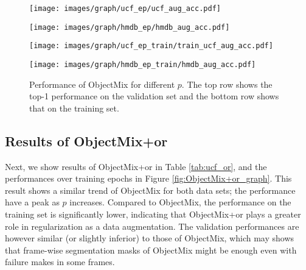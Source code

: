 \begin{figure}[t]
    \centering
    

    
    \begin{minipage}[t]{0.49\linewidth}
    \centering
    \texttt{[image: images/graph/ucf\_ep/ucf\_aug\_acc.pdf]}
    \end{minipage}
    \hfill
    \begin{minipage}[t]{0.49\linewidth}
    \centering
    \texttt{[image: images/graph/hmdb\_ep/hmdb\_aug\_acc.pdf]}
    \end{minipage}

    \begin{minipage}[t]{0.49\linewidth}
    \centering
    \texttt{[image: images/graph/ucf\_ep\_train/train\_ucf\_aug\_acc.pdf]}
    \label{fig:hmdb_aug_acc_t}
    \end{minipage}
    \hfill
    \begin{minipage}[t]{0.49\linewidth}
    \centering
    \texttt{[image: images/graph/hmdb\_ep\_train/hmdb\_aug\_acc.pdf]}
    \label{fig:hmdb_ep_acc}
    \end{minipage}

    \caption{
    Performance of ObjectMix for different $p$.
    The top row shows the top-1 performance on the validation set and the bottom row shows that on the training set.
    }

    \label{fig:ObjectMix_graph}
\end{figure}











\subsection{Results of ObjectMix+or}

Next, we show results of ObjectMix+or in Table \ref{tab:ucf_or},
and the performances over training epochs in Figure \ref{fig:ObjectMix+or_graph}.
This result shows a similar trend of ObjectMix for both data sets;
the performance have a peak as $p$ increases.
Compared to ObjectMix, the performance on the training set is significantly lower,
indicating that ObjectMix+or plays a greater role in regularization as a data augmentation.
The validation performances are however similar (or slightly inferior) to those of ObjectMix,
which may shows that
frame-wise segmentation masks of ObjectMix might be enough even with failure makes in some frames.



